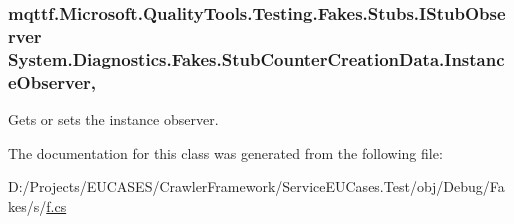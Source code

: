 \hypertarget{class_system_1_1_diagnostics_1_1_fakes_1_1_stub_counter_creation_data_a09bbab9032d29f81bffaf1543ae6c836}{
\subsubsection[{Instance\-Observer}]{\setlength{\rightskip}{0pt plus 5cm}mqttf.\-Microsoft.\-Quality\-Tools.\-Testing.\-Fakes.\-Stubs.\-I\-Stub\-Observer System.\-Diagnostics.\-Fakes.\-Stub\-Counter\-Creation\-Data.\-Instance\-Observer\hspace{0.3cm}{\ttfamily [get]}, {\ttfamily [set]}}}\label{class_system_1_1_diagnostics_1_1_fakes_1_1_stub_counter_creation_data_a09bbab9032d29f81bffaf1543ae6c836}


Gets or sets the instance observer.



The documentation for this class was generated from the following file\-:\begin{DoxyCompactItemize}
\item 
D\-:/\-Projects/\-E\-U\-C\-A\-S\-E\-S/\-Crawler\-Framework/\-Service\-E\-U\-Cases.\-Test/obj/\-Debug/\-Fakes/s/\hyperlink{s_2f_8cs}{f.\-cs}\end{DoxyCompactItemize}
